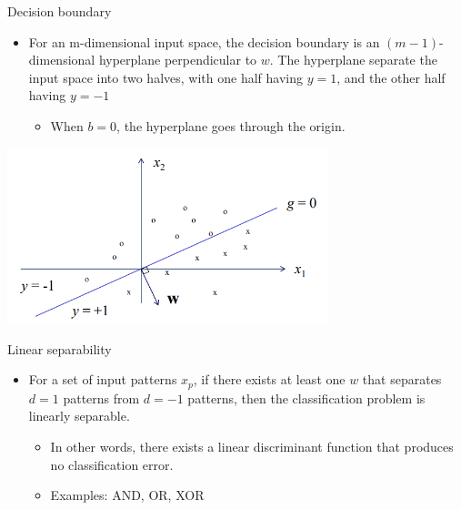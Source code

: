 \documentclass[notes]{beamer}
\providecommand{\tightlist}{%
  \setlength{\itemsep}{0pt}\setlength{\parskip}{0pt}}
\begin{document}
\begin{frame}{Decision boundary}

\begin{itemize}
\tightlist
\item
  For an m-dimensional input space, the decision boundary is an
  \((m-1)\)-dimensional hyperplane perpendicular to \(w\). The
  hyperplane separate the input space into two halves, with one half
  having \(y=1\), and the other half having \(y=-1\)

  \begin{itemize}
  \tightlist
  \item
    When \(b=0\), the hyperplane goes through the origin.
  \end{itemize}
\end{itemize}

\centering 

\includegraphics[width=0.70000\textwidth]{2018-03-08-22-30-37.png} ~

\end{frame}

\begin{frame}{Linear separability}

\begin{itemize}
\tightlist
\item
  For a set of input patterns \(x_p\), if there exists at least one
  \(w\) that separates \(d=1\) patterns from \(d=-1\) patterns, then the
  classification problem is linearly separable.

  \begin{itemize}
  \tightlist
  \item
    In other words, there exists a linear discriminant function that
    produces no classification error.
  \item
    Examples: AND, OR, XOR
  \end{itemize}
\end{itemize}

\end{frame}
\end{document}
